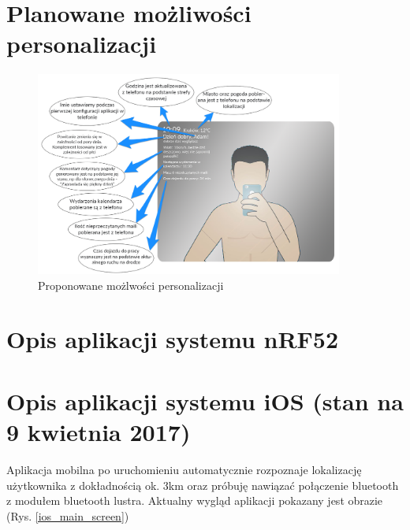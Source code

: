 \documentclass[a4paper,11pt]{article}
\begin{document}
\section{Planowane możliwości personalizacji}
\begin{figure}[H]
	\includegraphics[width=0.9\textwidth,center]{dymki_kreski.png}
	\caption {Proponowane możlwości personalizacji}
	\label{lustro_on}
\end{figure}

\section{Opis aplikacji systemu nRF52 }

\section{Opis aplikacji systemu iOS (stan na 9 kwietnia 2017)}

Aplikacja mobilna po uruchomieniu automatycznie rozpoznaje lokalizację użytkownika z dokładnością ok. 3km oraz próbuję nawiązać połączenie bluetooth z modułem bluetooth lustra. Aktualny wygląd aplikacji pokazany jest obrazie (Rys. \ref{ios_main_screen})
\end{document}
